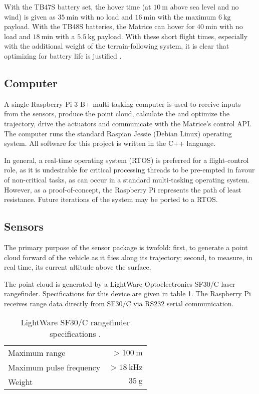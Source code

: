 With the TB47S battery set, the hover time (at $\SI{10}{\metre}$ above sea level and no wind) is given as $\SI{35}{\minute}$ with no load and $\SI{16}{\minute}$ with the maximum $\SI{6}{\kg}$ payload. With the TB48S batteries, the Matrice can hover for $\SI{40}{\minute}$ with no load and $\SI{18}{\minute}$ with a $\SI{5.5}{\kg}$ payload. With these short flight times, especially with the additional weight of the terrain-following system, it is clear that optimizing for battery life is justified \cite{DJI2017}.

\subsection{Computer}

A single Raspberry Pi 3 B+ multi-tasking computer is used to receive inputs from the sensors, produce the point cloud, calculate the and optimize the trajectory, drive the actuators and communicate with the Matrice's control API. The computer runs the standard Raspian Jessie (Debian Linux) operating system. All software for this project is written in the C++ language.

In general, a real-time operating system (RTOS) is preferred for a flight-control role, as it is undesirable for critical processing threads to be pre-empted in favour of non-critical tasks, as can occur in a standard multi-tasking operating system. However, as a proof-of-concept, the Raspberry Pi represents the path of least resistance. Future iterations of the system may be ported to a RTOS.

\subsection{Sensors}

The primary purpose of the sensor package is twofold: first, to generate a point cloud forward of the vehicle as it flies along its trajectory; second, to measure, in real time, its current altitude above the surface. 

The point cloud is generated by a LightWare Optoelectronics SF30/C laser rangefinder. Specifications for this device are given in table \ref{table:lwsf30cspecs}. The Raspberry Pi receives range data directly from SF30/C via RS232 serial communication.

\begin{table}
\begin{center}
\begin{tabular}{l r}
\hline
Maximum range & $> \SI{100}{\metre}$ \\
Maximum pulse frequency & $> \SI{18}{\kHz}$ \\
Weight & $\SI{35}{\g}$ \\
\hline
\end{tabular}
\end{center}
\caption{LightWare SF30/C rangefinder specifications \cite{LightWare2016}.}
\label{table:lwsf30cspecs}
\end{table}

